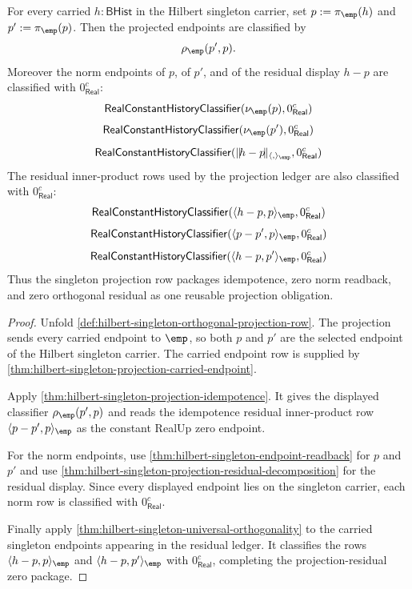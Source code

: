 \begin{theorem}
\label{thm:hilbert-singleton-projection-idempotent-residual-zero-package}
For every carried $h:\mathsf{BHist}$ in the Hilbert singleton carrier, set
$p:=\pi_{\emp}(h)$ and $p':=\pi_{\emp}(p)$. Then the projected endpoints are
classified by
$$
\rho_{\emp}(p',p).
$$
Moreover the norm endpoints of $p$, of $p'$, and of the residual display
$h-p$ are classified with $0_{\mathsf{Real}}^{c}$:
$$
\mathsf{RealConstantHistoryClassifier}(\nu_{\emp}(p),0_{\mathsf{Real}}^{c})
$$
$$
\mathsf{RealConstantHistoryClassifier}(\nu_{\emp}(p'),0_{\mathsf{Real}}^{c})
$$
$$
\mathsf{RealConstantHistoryClassifier}
  (\|\!h-p\!\|_{\langle,\rangle_{\emp}},0_{\mathsf{Real}}^{c})
$$
The residual inner-product rows used by the projection ledger are also
classified with $0_{\mathsf{Real}}^{c}$:
$$
\mathsf{RealConstantHistoryClassifier}
  (\langle h-p,p\rangle_{\emp},0_{\mathsf{Real}}^{c})
$$
$$
\mathsf{RealConstantHistoryClassifier}
  (\langle p-p',p\rangle_{\emp},0_{\mathsf{Real}}^{c})
$$
$$
\mathsf{RealConstantHistoryClassifier}
  (\langle h-p,p'\rangle_{\emp},0_{\mathsf{Real}}^{c})
$$
Thus the singleton projection row packages idempotence, zero norm readback,
and zero orthogonal residual as one reusable projection obligation.
\end{theorem}
\begin{proof}
Unfold \autoref{def:hilbert-singleton-orthogonal-projection-row}. The
projection sends every carried endpoint to $\emp$, so both $p$ and $p'$ are
the selected endpoint of the Hilbert singleton carrier. The carried endpoint
row is supplied by
\autoref{thm:hilbert-singleton-projection-carried-endpoint}.

Apply \autoref{thm:hilbert-singleton-projection-idempotence}. It gives the
displayed classifier $\rho_{\emp}(p',p)$ and reads the idempotence residual
inner-product row
$\langle p-p',p\rangle_{\emp}$ as the constant RealUp zero endpoint.

For the norm endpoints, use
\autoref{thm:hilbert-singleton-endpoint-readback} for $p$ and $p'$ and use
\autoref{thm:hilbert-singleton-projection-residual-decomposition} for the
residual display. Since every displayed endpoint lies on the singleton
carrier, each norm row is classified with $0_{\mathsf{Real}}^{c}$.

Finally apply \autoref{thm:hilbert-singleton-universal-orthogonality} to the
carried singleton endpoints appearing in the residual ledger. It classifies
the rows $\langle h-p,p\rangle_{\emp}$ and
$\langle h-p,p'\rangle_{\emp}$ with $0_{\mathsf{Real}}^{c}$, completing the
projection-residual zero package.
\end{proof}


